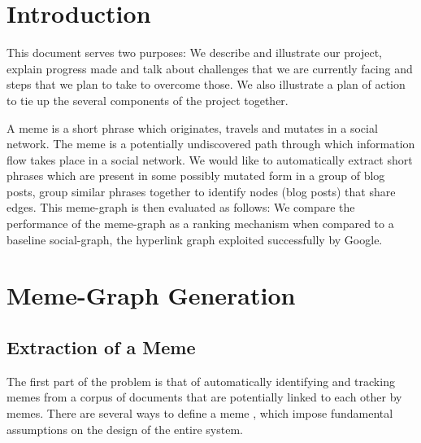 \documentclass{acm_proc_article-sp}
\begin{document}
\date{02 November 2011}

\maketitle


\section{Introduction}
This document serves two purposes: We describe and illustrate our project, explain progress made and talk about challenges that we are currently facing and steps that we plan to take to overcome those. We also illustrate a plan of action to tie up the several components of the project together. 

A meme is a short phrase which originates, travels and mutates in a social network. The meme is a potentially undiscovered path through which information flow takes place in a social network. We would like to automatically extract short phrases which are present in some possibly mutated form in a group of blog posts, group similar phrases together to identify nodes (blog posts) that share edges. This meme-graph is then evaluated as follows: We compare the performance of the meme-graph as a ranking mechanism when compared to a baseline social-graph, the hyperlink graph exploited successfully by Google. 

\section{Meme-Graph Generation}
\subsection{Extraction of a Meme}
The first part of the problem is that of automatically identifying and tracking memes from a corpus of documents that are potentially linked to each other by memes. There are several ways to define a meme \cite{leskovec2009meme},   \cite{kolak2008generating} which impose fundamental assumptions on the design of the entire system. 
\end{document}
